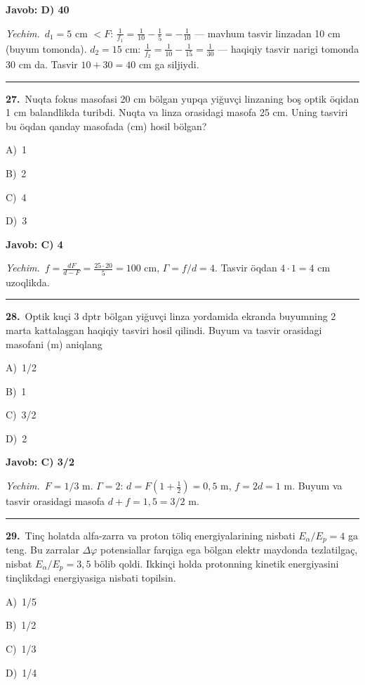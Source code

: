 \documentclass[11pt,a4paper]{article}
\newcommand{\opt}[2]{\hspace*{4mm}#1)\ #2\par}
\begin{document}
\noindent\colorbox{gray!12}{\parbox{\dimexpr\linewidth-2\fboxsep}{\textbf{Javob: D) 40}}}\par\smallskip
\noindent\textit{Yechim.}\ $d_1=5$ cm $<F$: $\frac1{f_1}=\frac1{10}-\frac15=-\frac1{10}$ — mavhum tasvir linzadan 10 cm (buyum tomonda). $d_2=15$ cm: $\frac1{f_2}=\frac1{10}-\frac1{15}=\frac1{30}$ — haqiqiy tasvir narigi tomonda 30 cm da. Tasvir $10+30=40$ cm ga siljiydi.\par\par\medskip\hrule\medskip
{}\noindent\begin{minipage}{\linewidth}
\textbf{27.}\ Nuqta fokus masofasi 20 cm bölgan yupqa yiğuvçi linzaning boş optik öqidan 1 cm balandlikda turibdi. Nuqta va linza orasidagi masofa 25 cm. Uning tasviri bu öqdan qanday masofada (cm) hosil bölgan?\par\smallskip
\opt{A}{1}
\opt{B}{2}
\opt{C}{4}
\opt{D}{3}
\end{minipage}\vspace{2pt}\par
\noindent\colorbox{gray!12}{\parbox{\dimexpr\linewidth-2\fboxsep}{\textbf{Javob: C) 4}}}\par\smallskip
\noindent\textit{Yechim.}\ $f=\frac{dF}{d-F}=\frac{25\cdot20}{5}=100$ cm, $\Gamma=f/d=4$. Tasvir öqdan $4\cdot1=4$ cm uzoqlikda.\par\par\medskip\hrule\medskip
{}\noindent\begin{minipage}{\linewidth}
\textbf{28.}\ Optik kuçi 3 dptr bölgan yiğuvçi linza yordamida ekranda buyumning 2 marta kattalaşgan haqiqiy tasviri hosil qilindi. Buyum va tasvir orasidagi masofani (m) aniqlang\par\smallskip
\opt{A}{1/2}
\opt{B}{1}
\opt{C}{3/2}
\opt{D}{2}
\end{minipage}\vspace{2pt}\par
\noindent\colorbox{gray!12}{\parbox{\dimexpr\linewidth-2\fboxsep}{\textbf{Javob: C) 3/2}}}\par\smallskip
\noindent\textit{Yechim.}\ $F=1/3$ m. $\Gamma=2$: $d=F\left(1+\frac12\right)=0{,}5$ m, $f=2d=1$ m. Buyum va tasvir orasidagi masofa $d+f=1{,}5=3/2$ m.\par\par\medskip\hrule\medskip
{}\noindent\begin{minipage}{\linewidth}
\textbf{29.}\ Tinç holatda alfa-zarra va proton töliq energiyalarining nisbati $E_\alpha/E_p=4$ ga teng. Bu zarralar $\Delta\varphi$ potensiallar farqiga ega bölgan elektr maydonda tezlatilgaç, nisbat $E_\alpha/E_p=3{,}5$ bölib qoldi. Ikkinçi holda protonning kinetik energiyasini tinçlikdagi energiyasiga nisbati topilsin.\par\smallskip
\opt{A}{1/5}
\opt{B}{1/2}
\opt{C}{1/3}
\opt{D}{1/4}
\end{minipage}\vspace{2pt}\par
\end{document}
